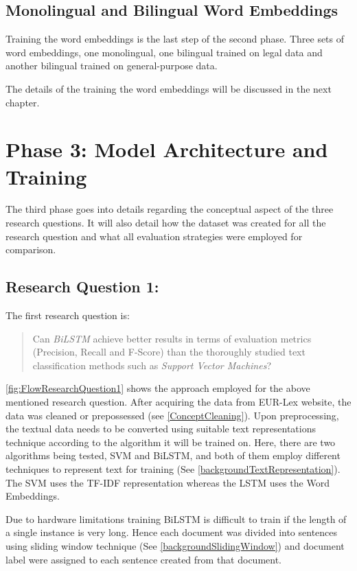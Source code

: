 \subsection*{Monolingual and Bilingual Word Embeddings}
Training the word embeddings is the last step of the second phase. Three sets of word embeddings, one monolingual, one bilingual trained on legal data and another bilingual trained on general-purpose data.   

The details of the training the word embeddings will be discussed in the next chapter.
\section{Phase 3: Model Architecture and Training}\label{sec:conceptRQ}
The third phase goes into details regarding the conceptual aspect of the three research questions. It will also detail how the dataset was created for all the research question and what all evaluation strategies were employed for comparison. 



\subsection{Research Question 1:} \label{question1}
The first research question is:
\begin{quote}
    Can \textit{\gls{BiLSTM}} achieve better results in terms of evaluation metrics (Precision, Recall and F-Score) than the thoroughly studied text classification methods such as \textit{Support Vector Machines}?
\end{quote}

\ref{fig:FlowResearchQuestion1} shows the approach employed for the above mentioned research question. After acquiring the data from EUR-Lex website, the data was cleaned or prepossessed (see \ref{ConceptCleaning}). Upon preprocessing, the textual data needs to be converted using suitable text representations technique according to the algorithm it will be trained on. Here, there are two algorithms being tested, \gls{SVM} and \gls{BiLSTM}, and both of them employ different techniques to represent text for training (See \ref{backgroundTextRepresentation}). The \gls{SVM} uses the \gls{TF-IDF} representation whereas the LSTM uses the Word Embeddings. 
 
Due to hardware limitations training \gls{BiLSTM} is difficult to train if the length of a single instance is very long. Hence each document was divided into sentences using sliding window technique (See \ref{backgroundSlidingWindow}) and document label were assigned to each sentence created from that document. 

